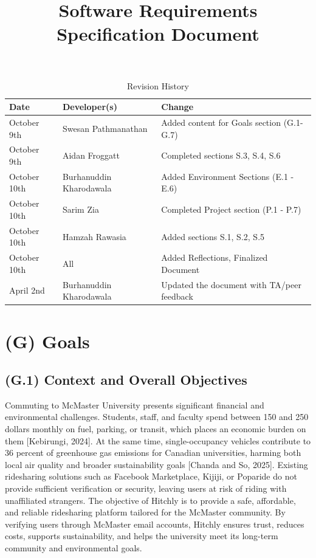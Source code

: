 \documentclass[12pt,letterpaper]{article}
\title{Software Requirements Specification Document\\\progname}
\author{\authname}
\date{}
\begin{document}
\maketitle

\setcounter{tocdepth}{3}
\makeatletter
{}
\makeatother
\begin{table}[hp]
  \caption{Revision History} \label{TblRevisionHistory}
  \begin{tabularx}{\textwidth}{llX}
  \toprule
  \textbf{Date} & \textbf{Developer(s)} & \textbf{Change}\\
  \midrule
  October 9th & Swesan Pathmanathan & Added content for Goals section (G.1-G.7)\\
  October 9th & Aidan Froggatt & Completed sections S.3, S.4, S.6\\
  October 10th & Burhanuddin Kharodawala & Added Environment Sections (E.1 - E.6)\\
  October 10th & Sarim Zia & Completed Project section (P.1 - P.7)\\
  October 10th & Hamzah Rawasia & Added sections S.1, S.2, S.5\\
  October 10th & All & Added Reflections, Finalized Document\\
  April 2nd & Burhanuddin Kharodawala & Updated the document with TA/peer feedback\\
  
  \bottomrule
  \end{tabularx}
  \end{table}

  \clearpage

\section{(G) Goals}
\label{sec:goals}

\subsection{(G.1) Context and Overall Objectives}
\label{sec:goals1}

Commuting to McMaster University presents significant financial and environmental challenges. Students, staff, and faculty spend between 150 and 250 dollars monthly on fuel, parking, or transit, which places an economic burden on them [Kebirungi, 2024]. At the same time, single-occupancy vehicles contribute to 36 percent of greenhouse gas emissions for Canadian universities, harming both local air quality and broader sustainability goals [Chanda and So, 2025]. Existing ridesharing solutions such as Facebook Marketplace, Kijiji, or Poparide do not provide sufficient verification or security, leaving users at risk of riding with unaffiliated strangers. The objective of Hitchly is to provide a safe, affordable, and reliable ridesharing platform tailored for the McMaster community. By verifying users through McMaster email accounts, Hitchly ensures trust, reduces costs, supports sustainability, and helps the university meet its long-term community and environmental goals. 
\end{document}

